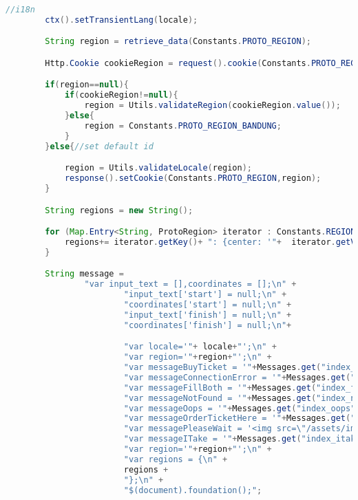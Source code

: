 \begin{lstlisting}[language=Java,basicstyle=\tiny,caption=Application.java]
        //i18n
        ctx().setTransientLang(locale);

        String region = retrieve_data(Constants.PROTO_REGION);

        Http.Cookie cookieRegion = request().cookie(Constants.PROTO_REGION);

        if(region==null){
            if(cookieRegion!=null){
                region = Utils.validateRegion(cookieRegion.value());
            }else{
                region = Constants.PROTO_REGION_BANDUNG;
            }
        }else{//set default id

            region = Utils.validateLocale(region);
            response().setCookie(Constants.PROTO_REGION,region);
        }

        String regions = new String();

        for (Map.Entry<String, ProtoRegion> iterator : Constants.REGIONINFOS.entrySet()) {
            regions+= iterator.getKey()+ ": {center: '"+  iterator.getValue().getLat() + ","+ iterator.getValue().getLon() + "', zoom: "+ iterator.getValue().getZoom() +"},";
        }

        String message =
                "var input_text = [],coordinates = [];\n" +
                        "input_text['start'] = null;\n" +
                        "coordinates['start'] = null;\n" +
                        "input_text['finish'] = null;\n" +
                        "coordinates['finish'] = null;\n"+

                        "var locale='"+ locale+"';\n" +
                        "var region='"+region+"';\n" +
                        "var messageBuyTicket = '"+Messages.get("index_buyticket")+"';\n" +
                        "var messageConnectionError = '"+Messages.get("index_connectionerror")+"';\n" +
                        "var messageFillBoth = '"+Messages.get("index_fillboth")+"';\n" +
                        "var messageNotFound = '"+Messages.get("index_notfound")+"';\n" +
                        "var messageOops = '"+Messages.get("index_oops")+"';\n" +
                        "var messageOrderTicketHere = '"+Messages.get("index_order_ticket_here")+"';\n" +
                        "var messagePleaseWait = '<img src=\"/assets/images/loading.gif\" alt=\"... \"/>'+ '"+Messages.get("index_pleasewait")+"';\n" +
                        "var messageITake = '"+Messages.get("index_itake")+"';\n" +
                        "var region='"+region+"';\n" +
                        "var regions = {\n" +
                        regions +
                        "};\n" +
                        "$(document).foundation();";


\end{lstlisting}
